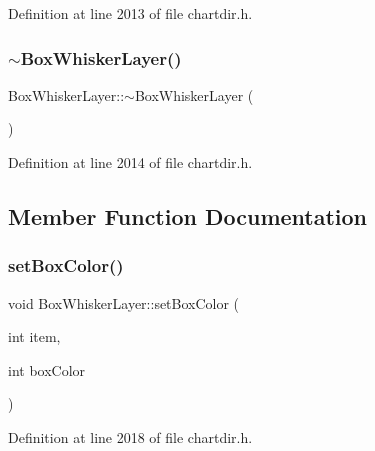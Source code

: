 Definition at line 2013 of file chartdir.\+h.

\mbox{\label{class_box_whisker_layer_a7610db0d4d0899bb743f92d05b563bc5}} 
\subsubsection{\texorpdfstring{$\sim$\+Box\+Whisker\+Layer()}{~BoxWhiskerLayer()}}
{\footnotesize\ttfamily Box\+Whisker\+Layer\+::$\sim$\+Box\+Whisker\+Layer (\begin{DoxyParamCaption}{ }\end{DoxyParamCaption})\hspace{0.3cm}{\ttfamily [inline]}}



Definition at line 2014 of file chartdir.\+h.



\subsection{Member Function Documentation}
\mbox{\label{class_box_whisker_layer_a5112e86b72df00f7189b56bbe795d40e}} 
\subsubsection{\texorpdfstring{set\+Box\+Color()}{setBoxColor()}}
{\footnotesize\ttfamily void Box\+Whisker\+Layer\+::set\+Box\+Color (\begin{DoxyParamCaption}\item[{int}]{item,  }\item[{int}]{box\+Color }\end{DoxyParamCaption})\hspace{0.3cm}{\ttfamily [inline]}}



Definition at line 2018 of file chartdir.\+h.

